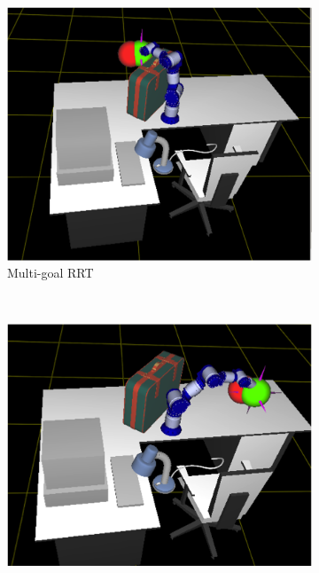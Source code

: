 \documentclass[letterpaper, 10 pt, conference]{ieeeconf}  %
\begin{document}
\begin{figure}
        \centering
        \begin{subfigure}[b]{0.4\textwidth}
                \centering
                \includegraphics[width=\textwidth]{fig/vismulti}
                \caption{Multi-goal RRT}
                \label{fig:vismulti}
        \end{subfigure}%
        ~ %
        \\
        \begin{subfigure}[b]{0.4\textwidth}
                \centering
                \includegraphics[width=\textwidth]{fig/vissingle}

\end{subfigure}
\end{figure}
\end{document}
